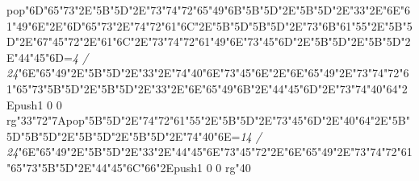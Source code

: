 pop{}\bigskip\ipa\char"6D\ipa\char"65\ipa\char"73\ipa\char"2E\ipa\char"5B\quad\quad\quad\ipa\char"5D\ipa\char"2E\ipa\char"73\ipa\char"74\ipa\char"72\ipa\char"65\ipa\char"49\ipa\char"6B\bigskip\ipa\char"5B\quad\quad\ipa\char"5D\ipa\char"2E\ipa\char"5B\quad\quad\quad\quad\ipa\char"5D\ipa\char"2E\ipa\char"33\ipa\char"2E\ipa\char"6E\ipa\char"61\ipa\char"49\ipa\char"6E\ipa\char"2E\ipa\char"6D\ipa\char"65\ipa\char"73\ipa\char"2E\ipa\char"74\ipa\char"72\ipa\char"61\ipa\char"6C\ipa\char"2E\ipa\char"5B\quad\quad\quad\ipa\char"5D\bigskip\ipa\char"5B\quad\ipa\char"5D\ipa\char"2E\ipa\char"73\ipa\char"6B\ipa\char"61\ipa\char"55\ipa\char"2E\ipa\char"5B\quad\quad\ipa\char"5D\ipa\char"2E\ipa\char"67\ipa\char"45\ipa\char"72\ipa\char"2E\ipa\char"61\ipa\char"6C\ipa\char"2E\ipa\char"73\ipa\char"74\ipa\char"72\ipa\char"61\ipa\char"49\ipa\char"6E\bigskip\ipa\char"73\ipa\char"45\ipa\char"6D\ipa\char"2E\ipa\char"5B\quad\quad\ipa\char"5D\ipa\char"2E\ipa\char"5B\quad\quad\quad\ipa\char"5D\ipa\char"2E\ipa\char"44\ipa\char"45\ipa\char"6D\bigskip\vfill\footline={\hfill\tenrm\it 4 / 24}\eject\null\vfill\ipa\char"6E\ipa\char"65\ipa\char"49\ipa\char"2E\ipa\char"5B\quad\quad\quad\quad\ipa\char"5D\ipa\char"2E\ipa\char"33\ipa\char"2E\ipa\char"74\ipa\char"40\ipa\char"6E\bigskip\ipa\char"73\ipa\char"45\ipa\char"6E\ipa\char"2E\ipa\char"6E\ipa\char"65\ipa\char"49\ipa\char"2E\ipa\char"73\ipa\char"74\ipa\char"72\ipa\char"61\ipa\char"65\ipa\char"73\bigskip\ipa\char"5B\quad\quad\ipa\char"5D\ipa\char"2E\ipa\char"5B\quad\quad\quad\quad\ipa\char"5D\ipa\char"2E\ipa\char"33\ipa\char"2E\ipa\char"6E\ipa\char"65\ipa\char"49\ipa\char"6B\ipa\char"2E\ipa\char"44\ipa\char"45\ipa\char"6D\ipa\char"2E\ipa\char"73\ipa\char"74\ipa\char"40\ipa\char"64\ipa\char"2E\pdfcolorstack\match push{1 0 0 rg}\ipa\char"33\ipa\char"72\ipa\char"7A\pdfcolorstack\match pop{}\bigskip\ipa\char"5B\quad\ipa\char"5D\ipa\char"2E\ipa\char"74\ipa\char"72\ipa\char"61\ipa\char"55\ipa\char"2E\ipa\char"5B\quad\quad\ipa\char"5D\ipa\char"2E\ipa\char"73\ipa\char"45\ipa\char"6D\ipa\char"2E\ipa\char"40\ipa\char"64\ipa\char"2E\ipa\char"5B\quad\quad\quad\quad\quad\quad\ipa\char"5D\bigskip\ipa\char"5B\quad\quad\quad\ipa\char"5D\ipa\char"2E\ipa\char"5B\quad\quad\ipa\char"5D\ipa\char"2E\ipa\char"5B\quad\quad\quad\ipa\char"5D\ipa\char"2E\ipa\char"74\ipa\char"40\ipa\char"6E\bigskip\vfill\footline={\hfill\tenrm\it 14 / 24}\eject\null\vfill\ipa\char"6E\ipa\char"65\ipa\char"49\ipa\char"2E\ipa\char"5B\quad\quad\quad\quad\ipa\char"5D\ipa\char"2E\ipa\char"33\ipa\char"2E\ipa\char"44\ipa\char"45\ipa\char"6E\bigskip\ipa\char"73\ipa\char"45\ipa\char"72\ipa\char"2E\ipa\char"6E\ipa\char"65\ipa\char"49\ipa\char"2E\ipa\char"73\ipa\char"74\ipa\char"72\ipa\char"61\ipa\char"65\ipa\char"73\bigskip\ipa\char"5B\quad\quad\ipa\char"5D\ipa\char"2E\ipa\char"44\ipa\char"45\ipa\char"6C\ipa\char"66\ipa\char"2E\pdfcolorstack\match push{1 0 0 rg}\ipa\char"40\pdfcolorstack\match 